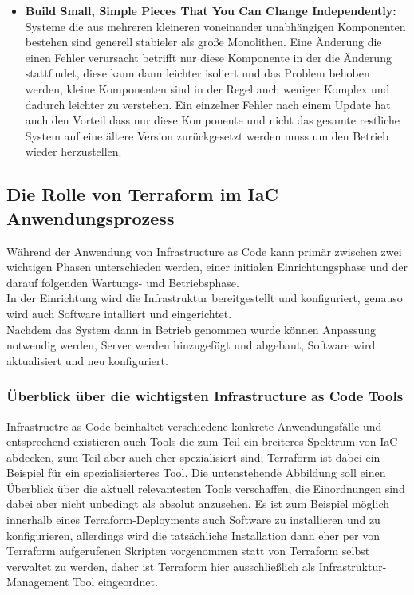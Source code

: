 \begin{spacing}{1.2}
\begin{itemize}
  \item \textbf{Build Small, Simple Pieces That You Can Change Independently:} 
  Systeme die aus mehreren kleineren voneinander unabhängigen Komponenten
  bestehen sind generell stabieler als große Monolithen. Eine Änderung die
  einen Fehler verursacht betrifft nur diese Komponente in der die Änderung
  stattfindet, diese kann dann leichter isoliert und das Problem behoben
  werden, kleine Komponenten sind in der Regel auch weniger Komplex und
  dadurch leichter zu verstehen. Ein einzelner Fehler nach einem Update
  hat auch den Vorteil dass nur diese Komponente und nicht das gesamte
  restliche System auf eine ältere Version zurückgesetzt werden muss um
  den Betrieb wieder herzustellen.

\end{itemize}

\subsection{Die Rolle von Terraform im IaC Anwendungsprozess}

Während der Anwendung von Infrastructure as Code kann primär zwischen zwei
wichtigen Phasen unterschieden werden, einer initialen Einrichtungsphase
und der darauf folgenden Wartungs- und Betriebsphase.\\
In der Einrichtung wird die Infrastruktur bereitgestellt und konfiguriert,
genauso wird auch Software intalliert und eingerichtet.\\
Nachdem das System dann in Betrieb genommen wurde können Anpassung notwendig
werden, Server werden hinzugefügt und abgebaut, Software wird aktualisiert
und neu konfiguriert.

\subsubsection{Überblick über die wichtigsten Infrastructure as Code Tools}

Infrastructre as Code beinhaltet verschiedene konkrete Anwendungsfälle und
entsprechend existieren auch Tools die zum Teil ein breiteres Spektrum
von IaC abdecken, zum Teil aber auch eher spezialisiert sind; Terraform
ist dabei ein Beispiel für ein spezialisierteres Tool. Die untenstehende
Abbildung soll einen Überblick über die aktuell relevantesten Tools
verschaffen, die Einordnungen sind dabei aber nicht unbedingt als absolut
anzusehen. Es ist zum Beispiel möglich innerhalb eines Terraform-Deployments
auch Software zu installieren und zu konfigurieren, allerdings wird die
tatsächliche Installation dann eher per von Terraform aufgerufenen Skripten
vorgenommen statt von Terraform selbst verwaltet zu werden, daher ist
Terraform hier ausschließlich als Infrastruktur-Management Tool eingeordnet.


\end{spacing}
